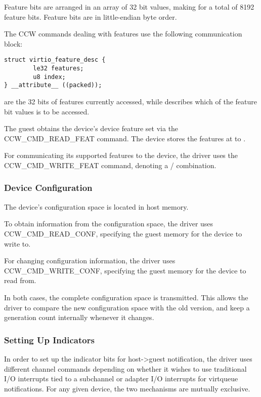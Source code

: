 Feature bits are arranged in an array of 32 bit values, making
for a total of 8192 feature bits. Feature bits are in
little-endian byte order.

The CCW commands dealing with features use the following
communication block:

\begin{lstlisting}
struct virtio_feature_desc {
        le32 features;
        u8 index;
} __attribute__ ((packed));
\end{lstlisting}

 are the 32 bits of features currently accessed, while
 describes which of the feature bit values is to be
accessed.

The guest obtains the device's device feature set via the
CCW_CMD_READ_FEAT command. The device stores the features at 
to .

For communicating its supported features to the device, the driver
uses the CCW_CMD_WRITE_FEAT command, denoting a /
combination.

\subsubsection{Device Configuration}\label{sec:Virtio Transport Options / Virtio over channel I/O / Device Initialization / Device Configuration}

The device's configuration space is located in host memory.

To obtain information from the configuration space, the driver
uses CCW_CMD_READ_CONF, specifying the guest memory for the device
to write to.

For changing configuration information, the driver uses
CCW_CMD_WRITE_CONF, specifying the guest memory for the device to
read from.

In both cases, the complete configuration space is transmitted.  This
allows the driver to compare the new configuration space with the old
version, and keep a generation count internally whenever it changes.

\subsubsection{Setting Up Indicators}\label{sec:Virtio Transport Options / Virtio over channel I/O / Device Initialization / Setting Up Indicators}

In order to set up the indicator bits for host->guest notification,
the driver uses different channel commands depending on whether it
wishes to use traditional I/O interrupts tied to a subchannel or
adapter I/O interrupts for virtqueue notifications. For any given
device, the two mechanisms are mutually exclusive.

